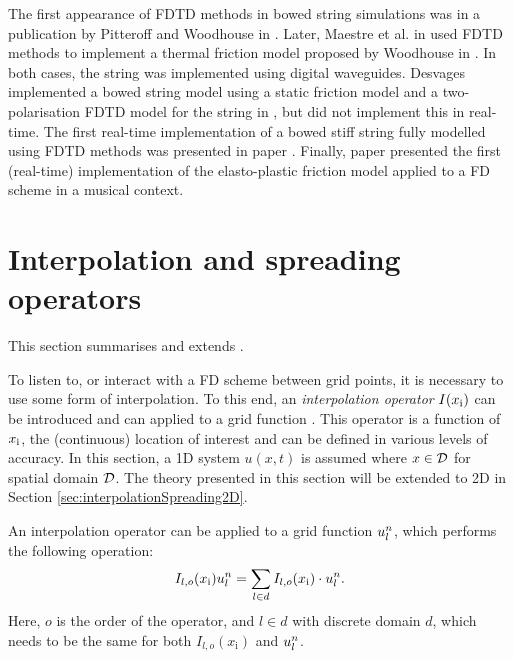 The first appearance of FDTD methods in bowed string simulations was in a publication by Pitteroff and Woodhouse in \cite{Pitteroff1998}. Later, Maestre et al. in \cite{Maestre2014} used FDTD methods to implement a thermal friction model proposed by Woodhouse in \cite{Woodhouse2003}. In both cases, the string was implemented using digital waveguides. Desvages implemented a bowed string model using a static friction model and a two-polarisation FDTD model for the string in \cite{Desvages2016, Desvages2018}, but did not implement this in real-time. The first real-time implementation of a bowed stiff string fully modelled using FDTD methods was presented in paper \citeP[A]. Finally, paper \citeP[C] presented the first (real-time) implementation of the elasto-plastic friction model applied to a FD scheme in a musical context.

\section{Interpolation and spreading operators}\label{sec:interpolationSpreading}
This section summarises and extends \cite[Sec. 5.2.4 pp. 101--104]{theBible}.

To listen to, or interact with a FD scheme between grid points, it is necessary to use some form of interpolation. 
To this end, an \textit{interpolation operator} $I(x_{\text{i}})$ can be introduced and can applied to a grid function \cite{theBible}. This operator is a function of $x_{\text{i}}$, the (continuous) location of interest and can be defined in various levels of accuracy. In this section, a 1D system $u(x,t)$ is assumed where $x\in \mathcal{D}$ for spatial domain $\mathcal{D}$. The theory presented in this section will be extended to 2D in Section \ref{sec:interpolationSpreading2D}.

An interpolation operator can be applied to a grid function $u_l^n$, which performs the following operation:
\begin{equation}
    I_{l,o}(x_{\text{i}})u_l^n = \sum_{l\in d} I_{l,o}(x_{\text{i}})\cdot u_l^n.
\end{equation} 
Here, $o$ is the order of the operator, and $l\in d$ with discrete domain $d$, which needs to be the same for both $I_{l,o}(x_\text{i})$ and $u_l^n$.

